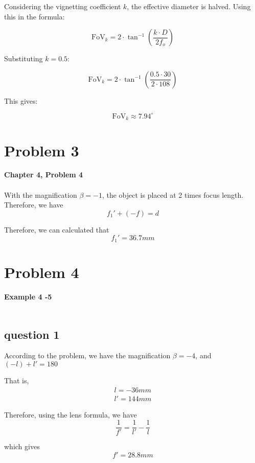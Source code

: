 \documentclass{article}
\begin{document}
Considering the vignetting coefficient \(k\), the effective diameter is halved. Using this in the formula:

\[
\text{FoV}_k = 2 \cdot \tan^{-1}\left(\frac{k \cdot D}{2f_{o}}\right)
\]

Substituting \(k = 0.5\):

\[
\text{FoV}_k = 2 \cdot \tan^{-1}\left(\frac{0.5 \cdot 30}{2 \cdot 108}\right)
\]

This gives:

\[
\boxed{\text{FoV}_k \approx 7.94^\circ}
\]

\section{Problem 3}
\textbf{Chapter 4, Problem 4}\\\\

With the magnification $\beta = -1$, the object is placed at 2 times focus length.
Therefore, we have
\begin{equation}
    f_1'+(-f) = d
\end{equation}

Therefore, we can calculated that
\begin{equation*}
    f_1' = 36.7mm
\end{equation*}

\section{Problem 4}
\textbf{Example 4   -5}\\\\

\subsection{question 1}
According to the problem, we have the magnification $\beta = -4$, and $(-l)+l'=180$

That is,
\begin{align}
    l = -36mm\\
    l' = 144mm   
\end{align}

Therefore, using the lens formula, we have
\begin{equation}
    \frac{1}{f'} = \frac{1}{l'} - \frac{1}{l}
\end{equation}

which gives
\begin{equation}
    \boxed{f' = 28.8mm}
\end{equation}
\end{document}
